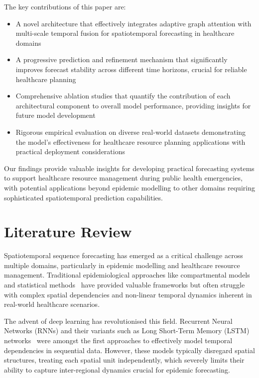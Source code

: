 \documentclass[lettersize, journal]{IEEEtran}
\begin{document}
The key contributions of this paper are:
\begin{itemize}
\item A novel architecture that effectively integrates adaptive graph attention with multi-scale temporal fusion for spatiotemporal forecasting in healthcare domains
\item A progressive prediction and refinement mechanism that significantly improves forecast stability across different time horizons, crucial for reliable healthcare planning
\item Comprehensive ablation studies that quantify the contribution of each architectural component to overall model performance, providing insights for future model development
\item Rigorous empirical evaluation on diverse real-world datasets demonstrating the model's effectiveness for healthcare resource planning applications with practical deployment considerations
\end{itemize}

Our findings provide valuable insights for developing practical forecasting systems to support healthcare resource management during public health emergencies, with potential applications beyond epidemic modelling to other domains requiring sophisticated spatiotemporal prediction capabilities.

\section{Literature Review}
Spatiotemporal sequence forecasting has emerged as a critical challenge across multiple domains, particularly in epidemic modelling and healthcare resource management. Traditional epidemiological approaches like compartmental models~\cite{compartmentalmodel} and statistical methods~\cite{sirbasedmodel} have provided valuable frameworks but often struggle with complex spatial dependencies and non-linear temporal dynamics inherent in real-world healthcare scenarios.

The advent of deep learning has revolutionised this field. Recurrent Neural Networks (RNNs) and their variants such as Long Short-Term Memory (LSTM) networks~\cite{lstm} were amongst the first approaches to effectively model temporal dependencies in sequential data. However, these models typically disregard spatial structures, treating each spatial unit independently, which severely limits their ability to capture inter-regional dynamics crucial for epidemic forecasting.
\end{document}
